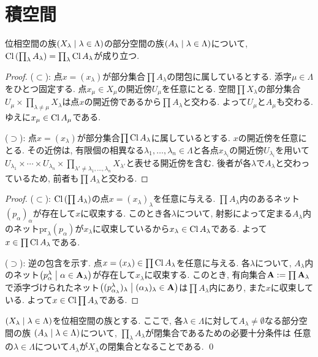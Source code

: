 \documentclass[uplatex, dvipdfmx, a4paper, 12pt, class=jsbook, crop=false]{standalone}
\begin{document}
\section{積空間}
\label{sec:product-spaces}

\newcommand{\directedA}{\mathbf{A}} %
\newcommand{\proj}{\mathrm{pr}} %

\begin{proposition}
	\label{02b3a9}
	位相空間の族$\setfamily{X_\lambda}{\lambda \in \Lambda}$の部分空間の族$\setfamily{A_\lambda}{\lambda \in \Lambda}$について, $ \mathop{\mathrm{Cl}}\nolimits \left(\prod_\lambda A_\lambda\right) = \prod_\lambda \mathop{\mathrm{Cl}}\nolimits A_\lambda $が成り立つ.
\end{proposition}

\begin{proof}
	($\subset$):
	点$x = (x_\lambda)$が部分集合$\prod A_\lambda$の閉包に属しているとする.
	添字$\mu \in \Lambda$をひとつ固定する.
	点$x_\mu \in X_\mu$の開近傍$U_\mu$を任意にとる.
	空間$\prod X_\lambda$の部分集合$U_\mu \times \prod_{\lambda \neq \mu} X_{\lambda}$は点$x$の開近傍であるから$\prod A_{\lambda}$と交わる.
	よって$U_\mu$と$A_\mu$も交わる. ゆえに$x_\mu \in \mathop{\mathrm{Cl}}\nolimits A_\mu$である.

	($\supset$):
	点$x = (x_\lambda)$が部分集合$\prod \mathop{\mathrm{Cl}}\nolimits A_\lambda$に属しているとする.
	$x$の開近傍を任意にとる.
	その近傍は, 有限個の相異なる$\lambda_1, \ldots, \lambda_n \in \Lambda$と各点$x_{\lambda_i}$の開近傍$U_{\lambda_i}$を用いて$U_{\lambda_1} \times \cdots \times U_{\lambda_n} \times \prod_{\lambda' \neq \lambda_1, \ldots, \lambda_n} X_{\lambda'}$と表せる開近傍を含む.
	後者が各$\lambda$で$A_\lambda$と交わっているため, 前者も$\prod A_\lambda$と交わる.
\end{proof}

\begin{proof}
	($\subset$):
	$\mathop{\mathrm{Cl}}\nolimits \left(\prod A_\lambda\right)$の点$x = (x_\lambda)_\lambda$を任意に与える.
	$\prod A_\lambda$内のあるネット$(p_\alpha)_\alpha$が存在して$x$に収束する.
	このとき各$\lambda$について, 射影によって定まる$A_\lambda$内のネット$\proj_\lambda (p_\alpha)$が$x_\lambda$に収束しているから$x_\lambda \in \mathop{\mathrm{Cl}}\nolimits A_\lambda$である.
	よって$x \in \prod \mathop{\mathrm{Cl}}\nolimits A_\lambda$である.

	($\supset$):
	逆の包含を示す.
	点$x = (x_\lambda) \in \prod \mathop{\mathrm{Cl}}\nolimits A_\lambda$を任意に与える.
	各$\lambda$について, $A_\lambda$内のネット$\setfamily{p^\lambda_\alpha}{\alpha \in \directedA_\lambda}$が存在して$x_\lambda$に収束する.
	このとき, 有向集合$\directedA \defeq \prod \directedA_\lambda$で添字づけられたネット$\setfamily{(p^\lambda_{\alpha_\lambda})_\lambda}{(\alpha_\lambda)_\lambda \in \directedA}$は$\prod A_\lambda$内にあり, また$x$に収束している.
	よって$x \in \mathop{\mathrm{Cl}}\nolimits \prod A_\lambda$である.
\end{proof}

\begin{corollary}
	\label{02e5k8}
	$ \setfamily{X_\lambda}{\lambda \in \Lambda} $を位相空間の族とする.
	ここで, 各$ \lambda \in \Lambda $に対して$ A_\lambda \neq \emptyset $なる部分空間の族
	$ \setfamily{A_\lambda}{\lambda \in \Lambda} $について,
	$ \prod_\lambda A_\lambda $が閉集合であるための必要十分条件は
	任意の$ \lambda \in \Lambda $について$ A_\lambda $が$ X_\lambda $の閉集合となることである.
	\qed
\end{corollary}
\end{document}

